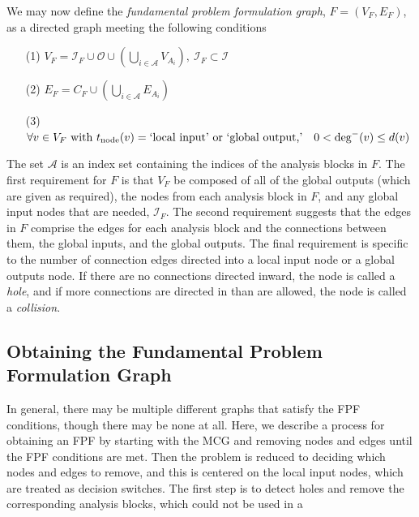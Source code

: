 We may now define the \emph{fundamental problem formulation graph}, $F=(V_F,E_F)$, as a directed graph meeting the following conditions
\begin{enumerate}
\item[(1)] $\displaystyle{V_F = \mathcal I_F \cup \mathcal O \cup \left( \bigcup_{i \in \mathcal A} V_{A_i} \right),\ \mathcal I_F \subset \mathcal I}$
\item[(2)] $\displaystyle{E_F = C_F \cup \left( \bigcup_{i \in \mathcal A} E_{A_i} \right)}$
\item[(3)] $\displaystyle{\forall v \in V_F \textrm{ with } t_\textrm{node}(v) = \textrm{`local input' or `global output,'}\quad 0 < \textrm{deg}^-(v) \leq d(v)}$
\end{enumerate}
The set $\mathcal A$ is an index set containing the indices of the analysis blocks in $F$. The first requirement for $F$ is that $V_F$ be composed of all of the global outputs (which are given as required), the nodes from each analysis block in $F$, and any global input nodes that are needed, $\mathcal I_F$. The second requirement suggests that the edges in $F$ comprise the edges for each analysis block and the connections between them, the global inputs, and the global outputs. The final requirement is specific to the number of connection edges directed into a local input node or a global outputs node. If there are no connections directed inward, the node is called a \emph{hole}, and if more connections are directed in than are allowed, the node is called a \emph{collision}.

\subsection{Obtaining the Fundamental Problem Formulation Graph}
In general, there may be multiple different graphs that satisfy the FPF conditions, though there may be none at all. Here, we describe a process for obtaining an FPF by starting with the MCG and removing nodes and edges until the FPF conditions are met. Then the problem is reduced to deciding which nodes and edges to remove, and this is centered on the local input nodes, which are treated as decision switches.
The first step is to detect holes and remove the corresponding analysis blocks, which could not be used in a 

